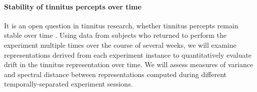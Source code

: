 \documentclass[11pt, notitlepage]{article} %
\begin{document}
\paragraph{Stability of tinnitus percepts over time}

It is an open question in tinnitus research, whether tinnitus percepts remain stable over time
\cite{husainReplicabilityNeuralBehavioral2019}.
Using data from subjects who returned to perform the experiment multiple times
over the course of several weeks,
we will examine representations derived from each experiment instance
to quantitatively evaluate drift in the tinnitus representation over time.
We will assess measures of variance and spectral distance between representations
computed during different temporally-separated experiment sessions.






\end{document}
